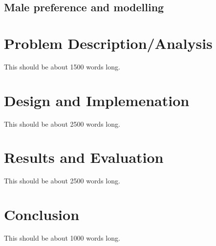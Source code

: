 \documentclass[authoryearcitations]{UoYCSproject}
\begin{document}
\section{Male preference and modelling}

\chapter{Problem Description/Analysis}
\label{cha:Problem Description}
This should be about 1500 words long.

\chapter{Design and Implemenation}
\label{cha:Design and Implementation}
This should be about 2500 words long.

\chapter{Results and Evaluation}
\label{cha:Results and Evaluation}
This should be about 2500 words long.

\chapter{Conclusion}
\label{cha:Conclusion}
This should be about 1000 words long.


 
\end{document}

